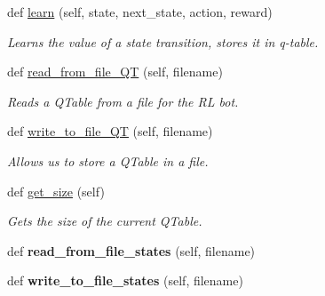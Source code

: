 \begin{DoxyCompactItemize}
\item 
def \hyperlink{classRLBrain_1_1RLBrain_acfa575d5f9331948ca20f9ccbf408886}{learn} (self, state, next\+\_\+state, action, reward)
\begin{DoxyCompactList}\small\item\em Learns the value of a state transition, stores it in q-\/table. \end{DoxyCompactList}\item 
def \hyperlink{classRLBrain_1_1RLBrain_a32246b81b1fef3ea2ae090b234c3b4f3}{read\+\_\+from\+\_\+file\+\_\+\+QT} (self, filename)
\begin{DoxyCompactList}\small\item\em Reads a Q\+Table from a file for the RL bot. \end{DoxyCompactList}\item 
def \hyperlink{classRLBrain_1_1RLBrain_a250a60c697c0748a12ac58eebaee6f7d}{write\+\_\+to\+\_\+file\+\_\+\+QT} (self, filename)
\begin{DoxyCompactList}\small\item\em Allows us to store a Q\+Table in a file. \end{DoxyCompactList}\item 
def \hyperlink{classRLBrain_1_1RLBrain_a007381445651792bf63a1d7b80c4a7f2}{get\+\_\+size} (self)
\begin{DoxyCompactList}\small\item\em Gets the size of the current Q\+Table. \end{DoxyCompactList}\item 
def {\bfseries read\+\_\+from\+\_\+file\+\_\+states} (self, filename)\hypertarget{classRLBrain_1_1RLBrain_a58ffb2733e58bba78ad1bdc47a7566cb}{}\label{classRLBrain_1_1RLBrain_a58ffb2733e58bba78ad1bdc47a7566cb}

\item 
def {\bfseries write\+\_\+to\+\_\+file\+\_\+states} (self, filename)\hypertarget{classRLBrain_1_1RLBrain_a0a32317798997801933b51fa11e8678b}{}\label{classRLBrain_1_1RLBrain_a0a32317798997801933b51fa11e8678b}

\end{DoxyCompactItemize}
